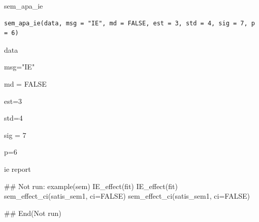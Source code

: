 \documentclass[a4paper]{book}
\begin{document}
%
\begin{Description}
sem\_apa\_ie
\end{Description}
%
\begin{Usage}
\begin{verbatim}
sem_apa_ie(data, msg = "IE", md = FALSE, est = 3, std = 4, sig = 7, p = 6)
\end{verbatim}
\end{Usage}
%
\begin{Arguments}
\begin{ldescription}
\item[\code{data}] data

\item[\code{msg}] msg="IE"

\item[\code{md}] md = FALSE

\item[\code{est}] est=3

\item[\code{std}] std=4

\item[\code{sig}] sig = 7

\item[\code{p}] p=6
\end{ldescription}
\end{Arguments}
%
\begin{Value}
ie report
\end{Value}
%
\begin{Examples}
\begin{ExampleCode}

\#\# Not run: 
example(sem)
IE_effect(fit)
IE_effect(fit) %
sem_effect_ci(satis_sem1, ci=FALSE)
sem_effect_ci(satis_sem1, ci=FALSE)%



## End(Not run)
\end{ExampleCode}
\end{Examples}
\end{document}
